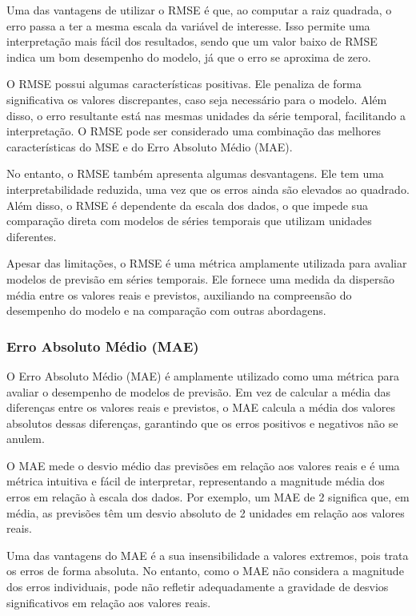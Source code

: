 Uma das vantagens de utilizar o RMSE é que, ao computar a raiz quadrada, o erro passa a ter a mesma escala da variável de interesse. Isso permite uma interpretação mais fácil dos resultados, sendo que um valor baixo de RMSE indica um bom desempenho do modelo, já que o erro se aproxima de zero.

O RMSE possui algumas características positivas. Ele penaliza de forma significativa os valores discrepantes, caso seja necessário para o modelo. Além disso, o erro resultante está nas mesmas unidades da série temporal, facilitando a interpretação. O RMSE pode ser considerado uma combinação das melhores características do MSE e do Erro Absoluto Médio (MAE).

No entanto, o RMSE também apresenta algumas desvantagens. Ele tem uma interpretabilidade reduzida, uma vez que os erros ainda são elevados ao quadrado. Além disso, o RMSE é dependente da escala dos dados, o que impede sua comparação direta com modelos de séries temporais que utilizam unidades diferentes.

Apesar das limitações, o RMSE é uma métrica amplamente utilizada para avaliar modelos de previsão em séries temporais. Ele fornece uma medida da dispersão média entre os valores reais e previstos, auxiliando na compreensão do desempenho do modelo e na comparação com outras abordagens.

\subsubsection{Erro Absoluto M\'edio (MAE)}

O Erro Absoluto Médio (MAE) é amplamente utilizado como uma métrica para avaliar o desempenho de modelos de previsão. Em vez de calcular a média das diferenças entre os valores reais e previstos, o MAE calcula a média dos valores absolutos dessas diferenças, garantindo que os erros positivos e negativos não se anulem.

O MAE mede o desvio médio das previsões em relação aos valores reais e é uma métrica intuitiva e fácil de interpretar, representando a magnitude média dos erros em relação à escala dos dados. Por exemplo, um MAE de 2 significa que, em média, as previsões têm um desvio absoluto de 2 unidades em relação aos valores reais.

Uma das vantagens do MAE é a sua insensibilidade a valores extremos, pois trata os erros de forma absoluta. No entanto, como o MAE não considera a magnitude dos erros individuais, pode não refletir adequadamente a gravidade de desvios significativos em relação aos valores reais.

